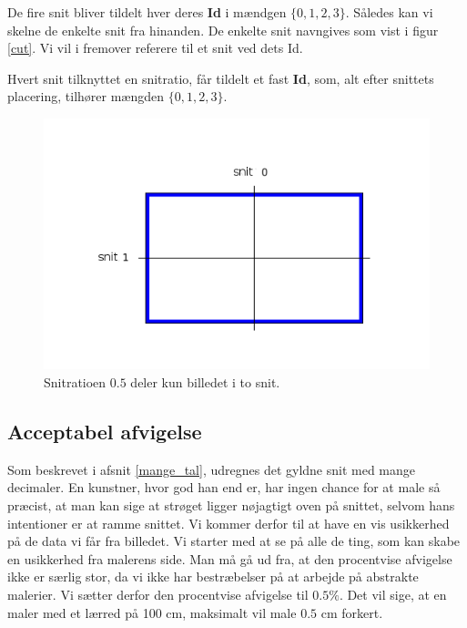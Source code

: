 {De fire snit bliver tildelt hver deres \textbf{Id} i mændgen $\{0,1,2,3\}$.
Således kan vi skelne de enkelte snit fra hinanden. De enkelte snit
navngives som vist i figur \ref{cut}. Vi vil i fremover referere til et
snit ved dets Id.

\begin{definition}
    Hvert snit tilknyttet en snitratio, får tildelt et fast \textbf{Id},
    som, alt efter snittets placering, tilhører mængden $\{0,1,2,3\}$.
\end{definition}

\begin{figure}[h]
    \centering
    \includegraphics[scale=0.42,angle=0]{afsnit/vores_implementation/billeder/naiv_algoritme/2Cut}
    \caption[]{Snitratioen $0.5$ deler kun billedet i to snit.}
    \label{2Cut}
\end{figure}

\subsection{Acceptabel afvigelse}
Som beskrevet i afsnit \ref{mange_tal}, udregnes det gyldne snit med
mange decimaler. En kunstner, hvor god han end er, har ingen chance for
at male så præcist, at man kan sige at strøget ligger nøjagtigt oven på
snittet, selvom hans intentioner er at ramme snittet. Vi kommer derfor
til at have en vis usikkerhed på de data vi får fra billedet. Vi starter
med at se på alle de ting, som kan skabe en usikkerhed fra malerens
side. Man må gå ud fra, at den procentvise afvigelse ikke er særlig
stor, da vi ikke har bestræbelser på at arbejde på abstrakte malerier.
Vi sætter derfor den procentvise afvigelse til $0.5 \%$. Det vil sige,
at en maler med et lærred på 100 cm, maksimalt vil male $0.5$ cm
forkert.

}
